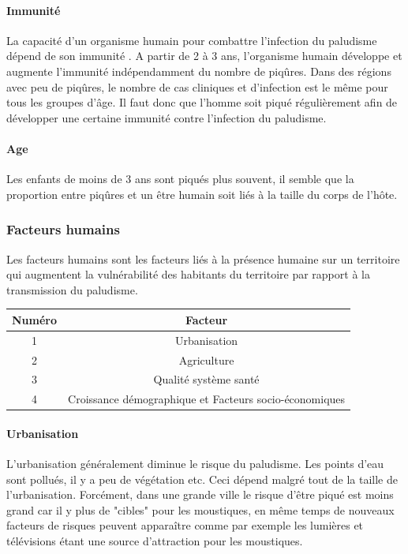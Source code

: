 \paragraph{Immunité} \label{immunite}
La capacité d'un organisme humain pour combattre l'infection du paludisme dépend de son immunité \citep{Protopopoff2009}. A partir de 2 à 3 ans, l'organisme humain développe et augmente l'immunité indépendamment du nombre de piqûres. Dans des régions avec peu de piqûres, le nombre de cas cliniques et d'infection est le même pour tous les groupes d'âge. Il faut donc que l'homme soit piqué régulièrement afin de développer une certaine immunité contre l'infection du paludisme.

\paragraph{Age}
Les enfants de moins de 3 ans sont piqués plus souvent, il semble que la proportion entre piqûres et un être humain soit liés à la taille du corps de l'hôte.  \citep{Ermert}

\subsubsection{Facteurs humains}
Les facteurs humains sont les facteurs liés à la présence humaine sur un territoire qui augmentent la vulnérabilité des habitants du territoire par rapport à la transmission du paludisme.

\begin{center}

\begin{tabular}{|c|c|} 
\hline
\textbf{Numéro} & \textbf{Facteur}\\
\hline
1 & Urbanisation \\
\hline
2 & Agriculture \\
\hline
3 & Qualité système santé \\
\hline
4 & Croissance démographique et Facteurs socio-économiques \\
\hline
\end{tabular}

\end{center}


\paragraph{Urbanisation}
L'urbanisation généralement diminue le risque du paludisme. Les points d'eau sont pollués, il y a peu de végétation etc. Ceci dépend malgré tout de la taille de l'urbanisation. Forcément, dans une grande ville le risque d'être piqué est moins grand car il y plus de "cibles" pour les moustiques, en même temps de nouveaux facteurs de risques peuvent apparaître comme par exemple les lumières et télévisions étant une source d'attraction pour les moustiques.

